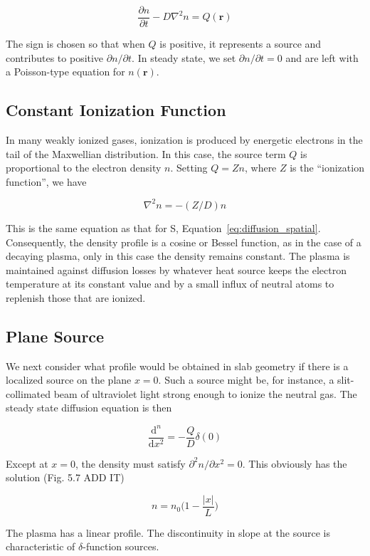 \documentclass[
  notoc %
]{tufte-book}
\begin{document}
\[
\frac{\partial n}{\partial t} - D\nabla^2 n = Q(\mathbf{r})
\]

The sign is chosen so that when \(Q\) is positive, it represents a
source and contributes to positive \(\partial n/\partial t\). In steady
state, we set \(\partial n/\partial t=0\) and are left with a
Poisson-type equation for \(n(\mathbf{r})\).

\hypertarget{constant-ionization-function}{%
\subsection{Constant Ionization
Function}\label{constant-ionization-function}}

In many weakly ionized gases, ionization is produced by energetic
electrons in the tail of the Maxwellian distribution. In this case, the
source term \(Q\) is proportional to the electron density \(n\). Setting
\(Q=Zn\), where \(Z\) is the ``ionization function'', we have

\[
\nabla^2 n = -(Z/D)n
\]

This is the same equation as that for S,
Equation~\ref{eq:diffusion_spatial}. Consequently, the density profile
is a cosine or Bessel function, as in the case of a decaying plasma,
only in this case the density remains constant. The plasma is maintained
against diffusion losses by whatever heat source keeps the electron
temperature at its constant value and by a small influx of neutral atoms
to replenish those that are ionized.

\hypertarget{plane-source}{%
\subsection{Plane Source}\label{plane-source}}

We next consider what profile would be obtained in slab geometry if
there is a localized source on the plane \(x=0\). Such a source might
be, for instance, a slit-collimated beam of ultraviolet light strong
enough to ionize the neutral gas. The steady state diffusion equation is
then

\[
\frac{\mathrm{d}^n}{\mathrm{d}x^2} = -\frac{Q}{D}\delta(0)
\]

Except at \(x=0\), the density must satisfy
\(\partial^2 n/\partial x^2=0\). This obviously has the solution (Fig.
5.7 ADD IT)

\[
n = n_0 \Big( 1-\frac{|x|}{L} \Big)
\]

The plasma has a linear profile. The discontinuity in slope at the
source is characteristic of \(\delta\)-function sources.
\end{document}
